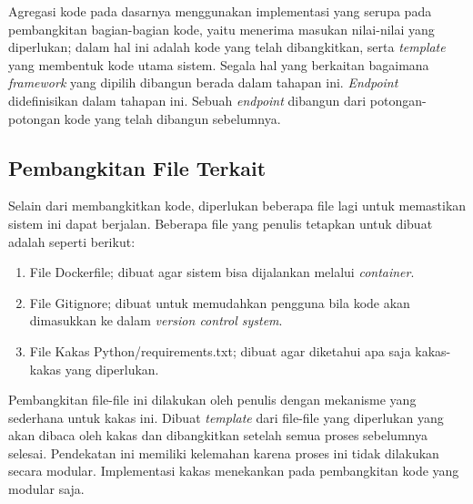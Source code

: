 Agregasi kode pada dasarnya menggunakan implementasi yang serupa pada pembangkitan bagian-bagian kode, yaitu menerima masukan nilai-nilai yang diperlukan; dalam hal ini adalah kode yang telah dibangkitkan, serta \textit{template} yang membentuk kode utama sistem.
Segala hal yang berkaitan bagaimana \textit{framework} yang dipilih dibangun berada dalam tahapan ini.
\textit{Endpoint} didefinisikan dalam tahapan ini.
Sebuah \textit{endpoint} dibangun dari potongan-potongan kode yang telah dibangun sebelumnya.

\subsection{Pembangkitan File Terkait}

Selain dari membangkitkan kode, diperlukan beberapa file lagi untuk memastikan sistem ini dapat berjalan.
Beberapa file yang penulis tetapkan untuk dibuat adalah seperti berikut:

\begin{enumerate}
    \item File Dockerfile; dibuat agar sistem bisa dijalankan melalui \textit{container}.
    \item File Gitignore; dibuat untuk memudahkan pengguna bila kode akan dimasukkan ke dalam \textit{version control system}.
    \item File Kakas Python/requirements.txt; dibuat agar diketahui apa saja kakas-kakas yang diperlukan.
\end{enumerate}

Pembangkitan file-file ini dilakukan oleh penulis dengan mekanisme yang sederhana untuk kakas ini.
Dibuat \textit{template} dari file-file yang diperlukan yang akan dibaca oleh kakas dan dibangkitkan setelah semua proses sebelumnya selesai.
Pendekatan ini memiliki kelemahan karena proses ini tidak dilakukan secara modular.
Implementasi kakas menekankan pada pembangkitan kode yang modular saja.